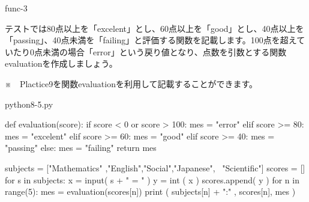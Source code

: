 \documentclass[11pt,a4paper,dvipdfmx,titlepage]{jsreport}
\begin{document}
\begin{pabox}{func-3}

テストでは80点以上を「excelent」とし、60点以上を「good」とし、40点以上を「passing」、40点未満を「failing」と評価する関数を記載します。100点を超えていたり0点未満の場合「error」という戻り値となり、点数を引数とする関数evaluationを作成しましょう。

※　Plactice9を関数evaluationを利用して記載することができます。

\begin{codebox}{python8-5.py}
\begin{listing}{1}
def evaluation(score):
    if score < 0 or score > 100:
            mes = "error"
    elif score >= 80:
            mes = "excelent"
    elif score >= 60:
            mes = "good"
    elif score >= 40:
            mes = "passing"
    else:
            mes = "failing"
    return mes

subjects = ["Mathematics" ,"English","Social","Japanese", \
			"Scientific"]
scores = []
for s in subjects:
    x = input( s + " = " )
    y = int ( x )
    scores.append( y )
for n in range(5):
    mes = evaluation(scores[n])
    print ( subjects[n] + ":" , scores[n], mes )
\end{listing}
\end{codebox}
\end{pabox}
\end{document}
